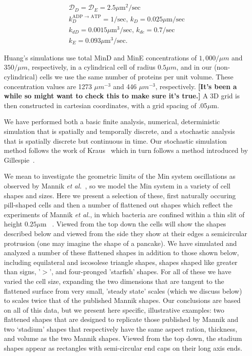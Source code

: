 \documentclass[letterpaper,twocolumn,amsmath,amssymb,pre]{revtex4-1}
\newcommand{\red}[1]{{\bf \color{red} #1}}
\newcommand{\fixme}[1]{\red{[#1]}}
\newcommand\micron{\ensuremath{\mu\text{m}}}
\begin{document}
\begin{gather*}
  \mathcal{D}_D = \mathcal{D}_{E} = 2.5\micron^2/\text{sec}\\
  k_D^{\textrm{ADP $\rightarrow$ ATP}} = 1/\textrm{sec,  }
  k_D = 0.025 \micron /\textrm{sec}\\
  k_{dD} = 0.0015 \micron^3/ \textrm{sec,  }
  k_{de} = 0.7/\textrm{sec}\\
  k_E = 0.093 \micron^3 /\textrm{sec}.
\end{gather*}

Huang's simulations use total MinD and MinE concentrations of
$1,000/\mu m$ and $350/\mu m$, respectively, in a cylindrical cell of
radius $0.5\mu m$, and in our (non-cylindrical) cells we use the same
number of proteins per unit volume.  These concentration values are
1273 $\mu m^{-3}$ and 446 $\mu m^{-3}$, respectively. \fixme{It's been
  a while so might want to check this to make sure it's true.}  A 3D
grid is then constructed in cartesian coordinates, with a grid spacing
of .05\micron.

We have performed both a basic finite analysis, numerical,
deterministic simulation that is spatially and temporally discrete,
and a stochastic analysis that is spatially discrete but continuous in
time.  Our stochastic simulation method follows the work of
Kraus~\cite{kraus1996crosstalk} which in turn follows a method
introduced by Gillespie~\cite{gillespie1977exact}.

We mean to investigate the geometric limits of the Min system
oscillations as observed by Mannik \emph{et
  al.}~\cite{mannik2012robustness}, so we model the Min system in a
variety of cell shapes and sizes.  Here we present a selection of
these, first naturally occuring pill-shaped cells and then a number of
flattened out shapes which reflect the experiments of Mannik \emph{et
  al.}, in which bacteria are confined within a thin slit of height
$0.25\micron$ ~\cite{mannik2012robustness}. Viewed from the top down
the cells will show the shapes described below and viewed from the
side they show at their edges a semicircular protrusion (one may
imagine the shape of a pancake). We have simulated and analyzed a
number of these flattened shapes in addition to those shown below,
including equilateral and iscosolese triangle shapes, shapes shaped
like greater than signs, '$>$', and four-pronged 'starfish' shapes.
For all of these we have varied the cell size, expanding the two
dimensions that are tangent to the flattened surface from very small,
'steady state' scales (which we discuss below) to scales twice that of
the published Mannik shapes.  Our conclusions are based on all of this
data, but we present here specific, illustrative examples: two
flattened shapes that are designed to replicate those published by
Mannik and two `stadium' shapes that respectively have the same aspect
ration, thickness, and volume as the two Mannik shapes.  Viewed from
the top down, the stadium shapes appear as rectangles with
semi-circular end caps on their long axis ends.
\end{document}
